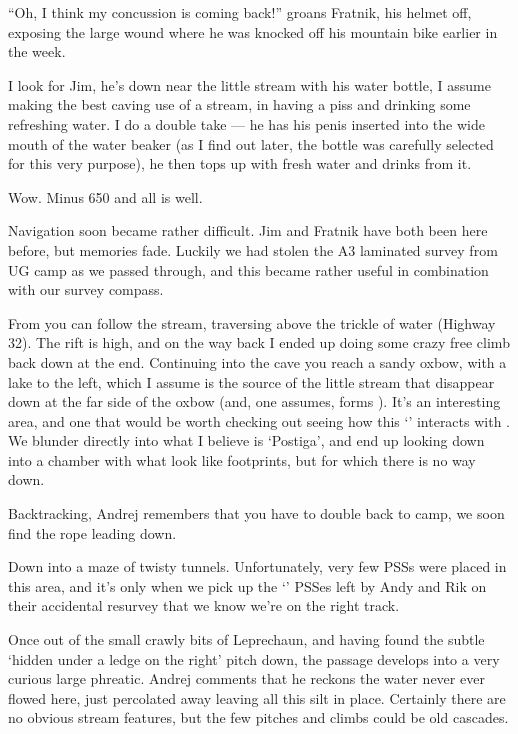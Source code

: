 ``Oh, I think my concussion is coming back!'' groans Fratnik, his helmet
off, exposing the large wound where he was knocked off his mountain bike
earlier in the week.

I look for Jim, he's down near the little stream with his water bottle,
I assume making the best caving use of a stream, in having a piss and
drinking some refreshing water. I do a double take --- he has his penis
inserted into the wide mouth of the water beaker (as I find out later,
the bottle was carefully selected for this very purpose), he then tops
up with fresh water and drinks from it.

Wow. Minus 650 and all is well.

Navigation soon became rather difficult. Jim and Fratnik have both been
here before, but memories fade. Luckily we had stolen the A3 laminated
survey from UG camp as we passed through, and this became rather useful
in combination with our survey compass.

From  you can follow the stream,
traversing above the trickle of water (Highway 32). The rift is high,
and on the way back I ended up doing some crazy free climb back down at
the end. Continuing into the cave you reach a sandy oxbow, with a lake
to the left, which I assume is the source of the little stream that
disappear down at the far side of the oxbow (and, one assumes, forms
). It's an interesting area, and one that would be worth
checking out seeing how this `' interacts with . We blunder directly into what I believe is `Postiga',
and end up looking down into a chamber with what look like footprints,
but for which there is no way down.

Backtracking, Andrej remembers that you have to double back to camp, we
soon find the rope leading down.

Down into a maze of twisty tunnels. Unfortunately, very few PSSs were
placed in this area, and it's only when we pick up the `' PSSes
left by Andy and Rik on their accidental resurvey that we know we're on
the right track.

Once out of the small crawly bits of Leprechaun, and having found the
subtle `hidden under a ledge on the right' pitch down, the passage
develops into a very curious large phreatic. Andrej comments that he
reckons the water never ever flowed here, just percolated away leaving
all this silt in place. Certainly there are no obvious stream features,
but the few pitches and climbs could be old cascades.

